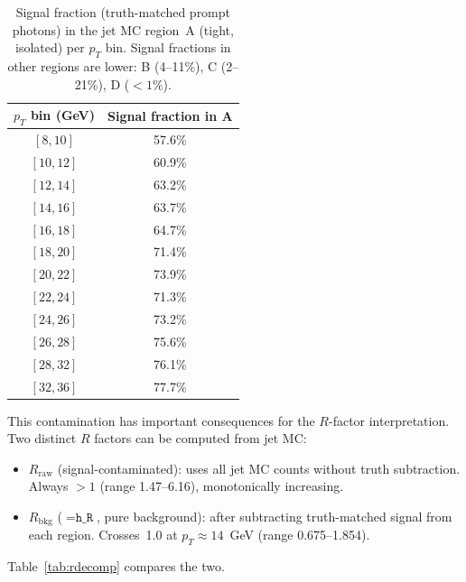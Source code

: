 \documentclass[11pt,a4paper]{article}
\begin{document}
\begin{table}[H]
\centering
\caption{Signal fraction (truth-matched prompt photons) in the jet MC
         region~A (tight, isolated) per $p_T$ bin. Signal fractions in
         other regions are lower: B (4--11\%), C (2--21\%), D ($<1\%$).}
\label{tab:sigfrac}
\begin{tabular}{@{}cc@{}}
\toprule
$p_T$ bin (GeV) & Signal fraction in A \\
\midrule
$[8,10]$   & 57.6\% \\
$[10,12]$  & 60.9\% \\
$[12,14]$  & 63.2\% \\
$[14,16]$  & 63.7\% \\
$[16,18]$  & 64.7\% \\
$[18,20]$  & 71.4\% \\
$[20,22]$  & 73.9\% \\
$[22,24]$  & 71.3\% \\
$[24,26]$  & 73.2\% \\
$[26,28]$  & 75.6\% \\
$[28,32]$  & 76.1\% \\
$[32,36]$  & 77.7\% \\
\bottomrule
\end{tabular}
\end{table}

This contamination has important consequences for the $R$-factor interpretation.
Two distinct $R$ factors can be computed from jet MC:
\begin{itemize}
\item $R_{\mathrm{raw}}$ (signal-contaminated): uses all jet MC counts without
      truth subtraction. Always $> 1$ (range 1.47--6.16), monotonically increasing.
\item $R_{\mathrm{bkg}}$ ($= \texttt{h\_R}$, pure background): after subtracting
      truth-matched signal from each region. Crosses~1.0 at $p_T \approx 14$~GeV
      (range 0.675--1.854).
\end{itemize}

Table~\ref{tab:rdecomp} compares the two.
\end{document}
